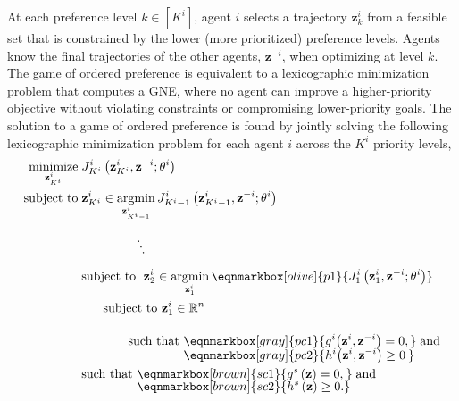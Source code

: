 At each preference level \(k \in [K^i]\), agent \(i\) selects a trajectory \(\mathbf{z}_k^i\)
from a feasible set that is constrained by the lower (more prioritized) preference levels.
Agents know the final trajectories
of the other agents, \(\mathbf{z}^{-i}\),
when optimizing at level \(k\).
The game of ordered preference is equivalent
to a lexicographic minimization problem that computes a GNE,
where no agent can improve a higher-priority objective without
violating constraints or compromising lower-priority goals.
The solution to a game of ordered preference is found by jointly solving the following lexicographic minimization problem for each agent \(i\) across the \(K^i\) priority levels,
\begin{align}
\begin{split}
\minimize_{\mathbf{z}^i_{K^i}}   &\; J^i_{K^i}\left(\mathbf{z}^i_{K^i}, \mathbf{z}^{-i}; \theta^i \right) \\
\text{subject to} &\; \mathbf{z}^i_{K^i} \in \argmin_{\mathbf{z}^i_{K^i-1}}{J_{K^i-1}^i\left(\mathbf{z}^i_{K^i-1}, \mathbf{z}^{-i}; \theta^i\right)} \\[1em]
                  & \qquad \qquad \text{\rotatebox[origin=c]{150}{$\ddots$}} \\
                  &\; \text{subject to }\; \mathbf{z}^i_2 \in \argmin_{\mathbf{z}^i_1} \eqnmarkbox[olive]{p1}{J^i_1\left(\mathbf{z}^i_1, \mathbf{z}^{-i}; \theta^i \right)}\\
                  &\qquad \text{subject to } \mathbf{z}_1^i \in \mathbb{R}^{n}\\[1em]
                  &\qquad \qquad \text{such that } \eqnmarkbox[gray]{pc1}{g^i{\left(\mathbf{z}^i, \mathbf{z}^{-i}\right)} = 0,} \text{\;and}\\[-.5em]
                  & \phantom{\qquad \qquad \text{such that }}  \eqnmarkbox[gray]{pc2}{h^i{\left(\mathbf{z}^i, \mathbf{z}^{-i}\right)} \geq 0\hspace{.215em}}\\
                  &\; \text{such that } \eqnmarkbox[brown]{sc1}{g^s\left(\mathbf{z}\right) = 0,\hspace{0.065em}} \text{\;and}\\[-.5em]
                  &\; \phantom{\text{such that }} \eqnmarkbox[brown]{sc2}{h^s\left(\mathbf{z}\right) \geq 0.}
\label{eq:trajgoop}
\end{split}
\end{align}

